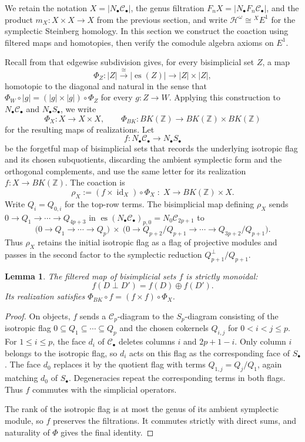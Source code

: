 \documentclass[12 pt]{amsart}
\newcommand{\ZZ}{\mathbb{Z}}
\newcommand{\cC}{\mathcal{C}}
\newcommand{\cH}{\mathcal{H}}
\newcommand{\EX}{{}^{X}\!E}
\newcommand{\es}{\operatorname{es}}
\newcommand{\<}{\langle}
\renewcommand{\>}{\rangle}
\newtheorem{lemma}[theorem]{Lemma}
\theoremstyle{definition}
\newcommand{\id}{\operatorname{id}}
\begin{document}
We retain the notation $X = |N_\bullet \cC_\bullet |$, the genus filtration $F_n X = |N_\bullet F_n \cC_\bullet |$, and the product $m_X \colon X \times X \to X$ from the previous section, and write $\cH^{\omega} \cong \EX^1$ for the symplectic Steinberg homology. In this section we construct the coaction using filtered maps and homotopies, then verify the comodule algebra axioms on $E^1$.

Recall from \cite[\S3]{BCGP} that edgewise subdivision gives, for every bisimplicial set $Z$, a map
\[ \Phi_Z \colon |Z| \xrightarrow{\ \cong \ } | \es(Z) | \longrightarrow |Z| \times |Z|, \]
homotopic to the diagonal and natural in the sense that $\Phi_W \circ |g| = (|g| \times |g|) \circ \Phi_Z$ for every $g \colon Z \to W$. Applying this construction to $N_\bullet \cC_\bullet$ and $N_\bullet S_\bullet$, we write
\[
\Phi_X \colon X \longrightarrow X \times X, \qquad \Phi_{BK} \colon BK(\ZZ) \longrightarrow BK(\ZZ) \times BK(\ZZ)
\]
for the resulting maps of realizations. Let
\[
f \colon N_\bullet \cC_\bullet \longrightarrow N_\bullet S_\bullet
\]
be the forgetful map of bisimplicial sets that records the underlying isotropic flag and its chosen subquotients, discarding the ambient symplectic form and the orthogonal complements, and use the same letter for its realization $f \colon X \to BK(\ZZ)$. The coaction is
\[ \rho_X := (f \times \id_X) \circ \Phi_X \; \colon \; X \longrightarrow BK(\ZZ) \times X. \]
Write $Q_i = Q_{0, i}$ for the top-row terms. The bisimplicial map defining $\rho_X$ sends $0 \to Q_1 \to \cdots \to Q_{4p + 3}$ in $\es(N_\bullet \cC_\bullet)_{p, 0} = N_0 \cC_{2p + 1}$ to
\[ \bigl(0 \to Q_1 \to \cdots \to Q_p\bigr) \ \times \ \bigl(0 \to Q_{p + 2}/Q_{p + 1} \to \cdots \to Q_{3p + 2}/Q_{p + 1}\bigr). \]
Thus $\rho_X$ retains the initial isotropic flag as a flag of projective modules and passes in the second factor to the symplectic reduction $Q_{p + 1}^{\perp}/Q_{p + 1}$.

\begin{lemma}\label{lem:f-strict}
The filtered map of bisimplicial sets $f$ is strictly monoidal:
\[
f(D \perp D') = f(D) \oplus f(D').
\]
Its realization satisfies $\Phi_{BK} \circ f = (f \times f) \circ \Phi_X$.
\end{lemma}

\begin{proof}
On objects, $f$ sends a $\cC_p$-diagram to the $S_p$-diagram consisting of the isotropic flag $0 \subseteq Q_1 \subseteq \cdots \subseteq Q_p$ and the chosen cokernels $Q_{i, j}$ for $0 < i < j \leq p$. For $1 \leq i \leq p$, the face $d_i$ of $\cC_\bullet$ deletes columns $i$ and $2p + 1 - i$. Only column $i$ belongs to the isotropic flag, so $d_i$ acts on this flag as the corresponding face of $S_\bullet$. The face $d_0$ replaces it by the quotient flag with terms $Q_{1, j} = Q_j/Q_1$, again matching $d_0$ of $S_\bullet$. Degeneracies repeat the corresponding terms in both flags. Thus $f$ commutes with the simplicial operators.

The rank of the isotropic flag is at most the genus of its ambient symplectic module, so $f$ preserves the filtrations. It commutes strictly with direct sums, and naturality of $\Phi$ gives the final identity.
\end{proof}
\end{document}
